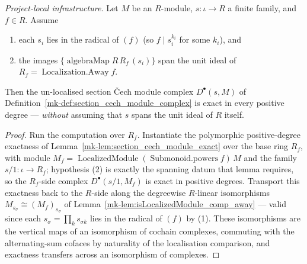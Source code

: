 \begin{lemma}\label{mk-lem:section_cech_module_exact_of_localizationAway}
  \leanok

  \textit{Project-local infrastructure.}
  Let \(M\) be an \(R\)-module, \(s : \iota \to R\) a finite family, and \(f \in R\). Assume
  \begin{enumerate}
  \item each \(s_i\) lies in the radical of \((f)\) (so \(f \mid s_i^{k_i}\) for some \(k_i\)), and
  \item the images \(\{\operatorname{algebraMap} R\, R_f\, (s_i)\}\) span the unit ideal of
    \(R_f = \operatorname{Localization.Away} f\).
  \end{enumerate}
  Then the un-localised section {\v C}ech module complex \(D^\bullet(s, M)\) of
  Definition~\ref{mk-def:section_cech_module_complex} is exact in every positive degree --- \emph{without}
  assuming that \(s\) spans the unit ideal of \(R\) itself.
\end{lemma}
\begin{proof}
  \leanok
  Run the computation over \(R_f\). Instantiate the polymorphic positive-degree exactness of
  Lemma~\ref{mk-lem:section_cech_module_exact} over the base ring \(R_f\), with module
  \(M_f = \operatorname{LocalizedModule}(\operatorname{Submonoid.powers} f)\, M\) and the family
  \(s/1 : \iota \to R_f\); hypothesis (2) is exactly the spanning datum that lemma requires, so the
  \(R_f\)-side complex \(D^\bullet(s/1, M_f)\) is exact in positive degrees. Transport this exactness
  back to the \(R\)-side along the degreewise \(R\)-linear isomorphisms
  \(M_{s_\sigma} \cong (M_f)_{s_\sigma}\) of Lemma~\ref{mk-lem:isLocalizedModule_comp_away} --- valid since
  each \(s_\sigma = \prod_k s_{\sigma k}\) lies in the radical of \((f)\) by (1). These isomorphisms are
  the vertical maps of an isomorphism of cochain complexes, commuting with the alternating-sum cofaces
  by naturality of the localisation comparison, and exactness transfers across an isomorphism of
  complexes.
\end{proof}

